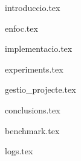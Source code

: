 \documentclass[10pt,a4paper]{report}
\begin{document}

{introduccio.tex}

{enfoc.tex}

{implementacio.tex}

{experiments.tex}

{gestio_projecte.tex}

{conclusions.tex}

\printbibliography[heading=bibliography]{}

{benchmark.tex}

{logs.tex}
\end{document}
